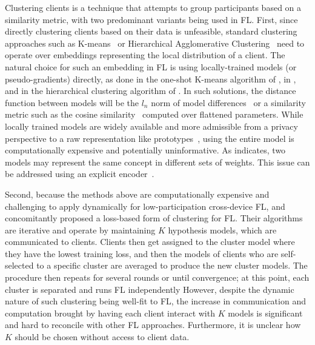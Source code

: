 Clustering clients is a technique that attempts to group participants based on a similarity metric, with two predominant variants being used in FL.  First, since directly clustering clients based on their data is unfeasible, standard clustering approaches such as K-means~\citep{K-means} or Hierarchical Agglomerative Clustering~\citep{OgHierClustering} need to operate over embeddings representing the local distribution of a client. The natural choice for such an embedding in FL is using locally-trained models (or pseudo-gradients) directly, as done in the one-shot K-means algorithm of \citet{AnEfficientFrameworkForClusteredFL}, in \citet{ClusteredFederatedLearningModelAgnostic}, and in the hierarchical clustering algorithm of \citet{HierClustering}. In such solutions, the distance function between models will be the $l_n$ norm of model differences~\citep{AnEfficientFrameworkForClusteredFL,HierClustering} or a similarity metric such as the cosine similarity~\citep{ClusteredFederatedLearningModelAgnostic,Auxo,HierClustering} computed over flattened parameters. While locally trained models are widely available and more admissible from a privacy perspective to a raw representation like prototypes~\citep{FedProto}, using the entire model is computationally expensive and potentially uninformative. As \citet{FedMA} indicates, two models may represent the same concept in different sets of weights. This issue can be addressed using an explicit encoder~\citep{CommunityBasedFL}.

Second, because the methods above are computationally expensive and challenging to apply dynamically for low-participation cross-device FL, \citet{AnEfficientFrameworkForClusteredFL} and \citet{ThreeApproachesMansour} concomitantly proposed a loss-based form of clustering for FL\@. Their algorithms are iterative and operate by maintaining $K$ hypothesis models, which are communicated to clients. Clients then get assigned to the cluster model where they have the lowest training loss, and then the models of clients who are self-selected to a specific cluster are averaged to produce the new cluster models. The procedure then repeats for several rounds or until convergence; at this point, each cluster is separated and runs FL independently However, despite the dynamic nature of such clustering being well-fit to FL, the increase in communication and computation brought by having each client interact with $K$ models is significant and hard to reconcile with other FL approaches. Furthermore, it is unclear how $K$ should be chosen without access to client data.

